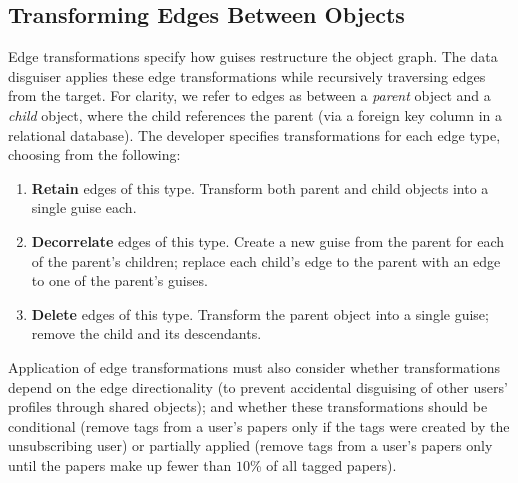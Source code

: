 \subsection{Transforming Edges Between Objects}
\label{design:edgepol}

Edge transformations specify how guises restructure the object graph.
The data disguiser applies these edge transformations while
recursively traversing edges from the target.  For clarity, we refer to edges as between a
\emph{parent} object and a \emph{child} object, where the child references the parent
(\eg via a foreign key column in a relational database).
%
The developer specifies transformations for each edge type, choosing from the following:
\begin{enumerate}[nosep]
    \item \textbf{Retain} edges of this type. Transform both parent and child objects into a single guise
        each.
    \item \textbf{Decorrelate} edges of this type. Create a new guise from the parent for each of
        the parent's children; replace each child's edge to the parent with an edge to one of the
        parent's guises.
    \item \textbf{Delete} edges of this type. Transform the parent object into a single guise;
        remove the child and its descendants.
\end{enumerate}

Application of edge transformations must also consider whether transformations depend on the edge
directionality (to \eg prevent accidental disguising of other users' profiles through shared objects);
and whether these transformations should be conditional (\eg remove tags from a user's papers only
if the tags were created by the unsubscribing user) or partially applied (\eg remove tags from a
user's papers only until the papers make up fewer than $10$\% of all tagged papers).


\iffalse

